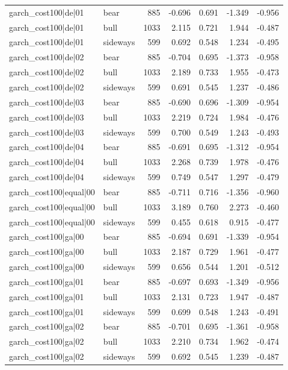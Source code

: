 \begin{table}
\begin{tabular}{llrrrrr}
garch\_cost100|de|01 & bear & 885 & -0.696 & 0.691 & -1.349 & -0.956 \\
garch\_cost100|de|01 & bull & 1033 & 2.115 & 0.721 & 1.944 & -0.487 \\
garch\_cost100|de|01 & sideways & 599 & 0.692 & 0.548 & 1.234 & -0.495 \\
garch\_cost100|de|02 & bear & 885 & -0.704 & 0.695 & -1.373 & -0.958 \\
garch\_cost100|de|02 & bull & 1033 & 2.189 & 0.733 & 1.955 & -0.473 \\
garch\_cost100|de|02 & sideways & 599 & 0.691 & 0.545 & 1.237 & -0.486 \\
garch\_cost100|de|03 & bear & 885 & -0.690 & 0.696 & -1.309 & -0.954 \\
garch\_cost100|de|03 & bull & 1033 & 2.219 & 0.724 & 1.984 & -0.476 \\
garch\_cost100|de|03 & sideways & 599 & 0.700 & 0.549 & 1.243 & -0.493 \\
garch\_cost100|de|04 & bear & 885 & -0.691 & 0.695 & -1.312 & -0.954 \\
garch\_cost100|de|04 & bull & 1033 & 2.268 & 0.739 & 1.978 & -0.476 \\
garch\_cost100|de|04 & sideways & 599 & 0.749 & 0.547 & 1.297 & -0.479 \\
garch\_cost100|equal|00 & bear & 885 & -0.711 & 0.716 & -1.356 & -0.960 \\
garch\_cost100|equal|00 & bull & 1033 & 3.189 & 0.760 & 2.273 & -0.460 \\
garch\_cost100|equal|00 & sideways & 599 & 0.455 & 0.618 & 0.915 & -0.477 \\
garch\_cost100|ga|00 & bear & 885 & -0.694 & 0.691 & -1.339 & -0.954 \\
garch\_cost100|ga|00 & bull & 1033 & 2.187 & 0.729 & 1.961 & -0.477 \\
garch\_cost100|ga|00 & sideways & 599 & 0.656 & 0.544 & 1.201 & -0.512 \\
garch\_cost100|ga|01 & bear & 885 & -0.697 & 0.693 & -1.349 & -0.956 \\
garch\_cost100|ga|01 & bull & 1033 & 2.131 & 0.723 & 1.947 & -0.487 \\
garch\_cost100|ga|01 & sideways & 599 & 0.699 & 0.548 & 1.243 & -0.491 \\
garch\_cost100|ga|02 & bear & 885 & -0.701 & 0.695 & -1.361 & -0.958 \\
garch\_cost100|ga|02 & bull & 1033 & 2.210 & 0.734 & 1.962 & -0.474 \\
garch\_cost100|ga|02 & sideways & 599 & 0.692 & 0.545 & 1.239 & -0.487 \\

\end{tabular}
\end{table}
